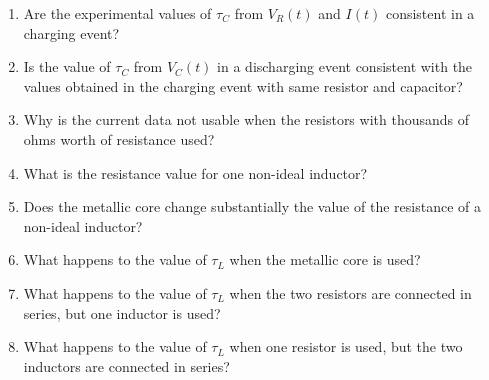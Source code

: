 \begin{enumerate}
    \item Are the experimental values of $\tau_{C}$ from $V_{R}(t)$ and $I(t)$ consistent in a charging event?
    \item Is the value of $\tau_{C}$ from $V_{C}(t)$ in a discharging event consistent with the values obtained in the charging event with same resistor and capacitor?
    \item Why is the current data not usable when the resistors with thousands of ohms worth of resistance used?
    \item What is the resistance value for one non-ideal inductor?
    \item Does the metallic core change substantially the value of the resistance of a non-ideal inductor?
    \item What happens to the value of $\tau_{L}$ when the metallic core is used?
    \item What happens to the value of $\tau_{L}$ when the two resistors are connected in series, but one inductor is used?
    \item What happens to the value of $\tau_{L}$ when one resistor is used, but the two inductors are connected in series?
\end{enumerate}
%
\newpage
